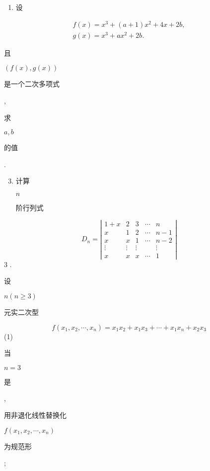 \documentclass[10pt]{article}
\begin{document}
\begin{enumerate}
  \item \begin{CJK}{UTF8}{mj}设\end{CJK}
\end{enumerate}
$$
\begin{gathered}
f(x)=x^{3}+(a+1) x^{2}+4 x+2 b, \\
g(x)=x^{3}+a x^{2}+2 b .
\end{gathered}
$$
\begin{CJK}{UTF8}{mj}且\end{CJK} $(f(x), g(x))$ \begin{CJK}{UTF8}{mj}是一个二次多项式\end{CJK}, \begin{CJK}{UTF8}{mj}求\end{CJK} $a, b$ \begin{CJK}{UTF8}{mj}的值\end{CJK}.

\begin{enumerate}
  \setcounter{enumi}{2}
  \item \begin{CJK}{UTF8}{mj}计算\end{CJK} $n$ \begin{CJK}{UTF8}{mj}阶行列式\end{CJK}
\end{enumerate}
$$
D_{n}=\left|\begin{array}{ccccc}
1+x & 2 & 3 & \cdots & n \\
x & 1 & 2 & \cdots & n-1 \\
x & x & 1 & \cdots & n-2 \\
\vdots & \vdots & \vdots & & \vdots \\
x & x & x & \cdots & 1
\end{array}\right|
$$
3 . \begin{CJK}{UTF8}{mj}设\end{CJK} $n(n \geqslant 3)$ \begin{CJK}{UTF8}{mj}元实二次型\end{CJK}
$$
f\left(x_{1}, x_{2}, \cdots, x_{n}\right)=x_{1} x_{2}+x_{1} x_{3}+\cdots+x_{1} x_{n}+x_{2} x_{3}
$$
(1) \begin{CJK}{UTF8}{mj}当\end{CJK} $n=3$ \begin{CJK}{UTF8}{mj}是\end{CJK}, \begin{CJK}{UTF8}{mj}用非退化线性替换化\end{CJK} $f\left(x_{1}, x_{2}, \cdots, x_{n}\right)$ \begin{CJK}{UTF8}{mj}为规范形\end{CJK};
\end{document}
